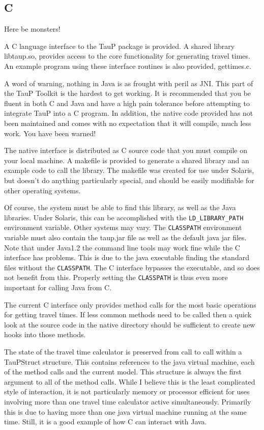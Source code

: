  
\subsection{C}
 
Here be monsters!

A C language interface to the TauP package is provided. A shared library
libtaup.so, provides access to the core functionality for generating travel 
times. An example program using these interface routines is also provided,
gettimes.c.

A word of warning, nothing in Java is as frought with peril as JNI. This part of the TauP Toolkit is the hardest to get working. It is recommended that you be
fluent in both C and Java and have a high pain tolerance before attempting to
integrate TauP into a C program. In addition, the native code provided has not
been maintained and comes with no expectation that it will compile, much less work.
 You have been warned!


The native interface is distributed as C source code that you must compile
on your local machine. A makefile is provided to generate a shared library
and an example code to call the library. The makefile was created for use under 
Solaris, but doesn't do anything particularly special, and should be
easily modifiable for other operating systems.

Of course, the system must be able to find this library, as well as the 
Java libraries. Under Solaris, this can be accomplished with the 
\texttt{LD\_LIBRARY\_PATH} environment variable. Other systems may vary.
The \texttt{CLASSPATH}  environment variable must also contain the taup.jar 
file as well as the default java jar files. Note that under Java1.2 the command
line tools may work fine while the C interface has problems. This is due to
the java executable finding the standard files without the \texttt{CLASSPATH}.
The C interface bypasses the executable, and so does not benefit from this.
Properly setting the \texttt{CLASSPATH} is thus even more important for calling
Java from C.

The current C interface only provides method calls for the most basic
operations for getting travel times. If less common methods need to be called
then a quick look at the source code in the native directory
should be sufficient to create new hooks into those methods.

The state of the travel time calculator is preserved from call to call within
a TauPStruct structure. This contains references to the java virtual machine,
each of the method calls and the current model. This structure is always
the first argument to all of the method calls. While I believe this is the
least complicated style of interaction, it is not particularly memory
or processor efficient for uses involving more than one travel time calculator
active simultaneously. Primarily this is due to having more than one
java virtual machine running at the same time. Still, it is a 
good example of how C can interact with Java.

